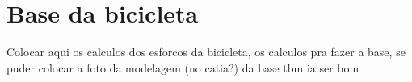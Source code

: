 \section{Base da bicicleta}
Colocar aqui os calculos dos esforcos da bicicleta, os calculos pra fazer a base, se puder colocar a foto da modelagem (no catia?) da base tbm ia ser bom